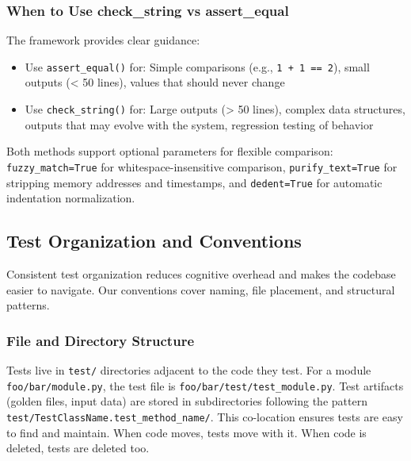 \subsubsection{When to Use check\_string vs assert\_equal}
The framework provides clear guidance:
\begin{itemize}
  \item Use \texttt{assert\_equal()} for: Simple comparisons (e.g.,
    \texttt{1 + 1 == 2}), small outputs (< 50 lines), values that should
    never change

  \item Use \texttt{check\_string()} for: Large outputs (> 50 lines),
    complex data structures, outputs that may evolve with the system,
    regression testing of behavior
\end{itemize}
Both methods support optional parameters for flexible comparison: \texttt{fuzzy\_match=True}
for whitespace-insensitive comparison, \texttt{purify\_text=True} for
stripping memory addresses and timestamps, and \texttt{dedent=True} for
automatic indentation normalization.

\subsection{Test Organization and Conventions}
Consistent test organization reduces cognitive overhead and makes the codebase
easier to navigate. Our conventions cover naming, file placement, and
structural patterns.

\subsubsection{File and Directory Structure}
Tests live in \texttt{test/} directories adjacent to the code they test.
For a module \texttt{foo/bar/module.py}, the test file is \texttt{foo/bar/test/test\_module.py}.
Test artifacts (golden files, input data) are stored in subdirectories
following the pattern \texttt{test/TestClassName.test\_method\_name/}.
This co-location ensures tests are easy to find and maintain. When code moves,
tests move with it. When code is deleted, tests are deleted too.

